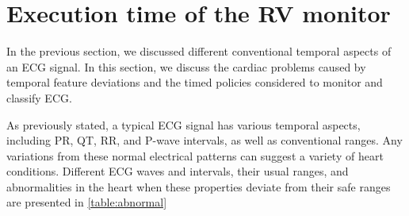\section{Execution time of the RV monitor}

In the previous section, we discussed different conventional temporal
aspects of an ECG signal. In this section, we discuss the cardiac problems caused by temporal feature deviations and the timed policies
considered to monitor and classify ECG.

As previously stated, a typical ECG signal has various temporal
aspects, including PR, QT, RR, and P-wave intervals, as well as
conventional ranges. Any variations from these normal electrical
patterns can suggest a variety of heart conditions. Different ECG
waves and intervals, their usual ranges, and abnormalities in the heart when these properties deviate from their safe ranges are presented in \ref{table:abnormal}

